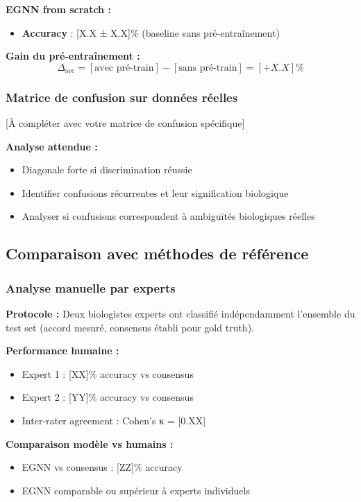 \textbf{EGNN from scratch :}
\begin{itemize}
    \item \textbf{Accuracy} : [X.X ± X.X]\% (baseline sans pré-entraînement)
\end{itemize}

\textbf{Gain du pré-entraînement :}
\[
\Delta_{\text{acc}} = [\text{avec pré-train}] - [\text{sans pré-train}] = [+X.X]\%
\]

\subsubsection{Matrice de confusion sur données réelles}

[À compléter avec votre matrice de confusion spécifique]

\textbf{Analyse attendue :}
\begin{itemize}
    \item Diagonale forte si discrimination réussie
    \item Identifier confusions récurrentes et leur signification biologique
    \item Analyser si confusions correspondent à ambiguïtés biologiques réelles
\end{itemize}

\subsection{Comparaison avec méthodes de référence}

\subsubsection{Analyse manuelle par experts}

\textbf{Protocole :}
Deux biologistes experts ont classifié indépendamment l'ensemble du test set (accord mesuré, consensus établi pour gold truth).

\textbf{Performance humaine :}
\begin{itemize}
    \item Expert 1 : [XX]\% accuracy vs consensus
    \item Expert 2 : [YY]\% accuracy vs consensus
    \item Inter-rater agreement : Cohen's κ = [0.XX]
\end{itemize}

\textbf{Comparaison modèle vs humains :}
\begin{itemize}
    \item EGNN vs consensus : [ZZ]\% accuracy
    \item EGNN comparable ou supérieur à experts individuels
\end{itemize}

